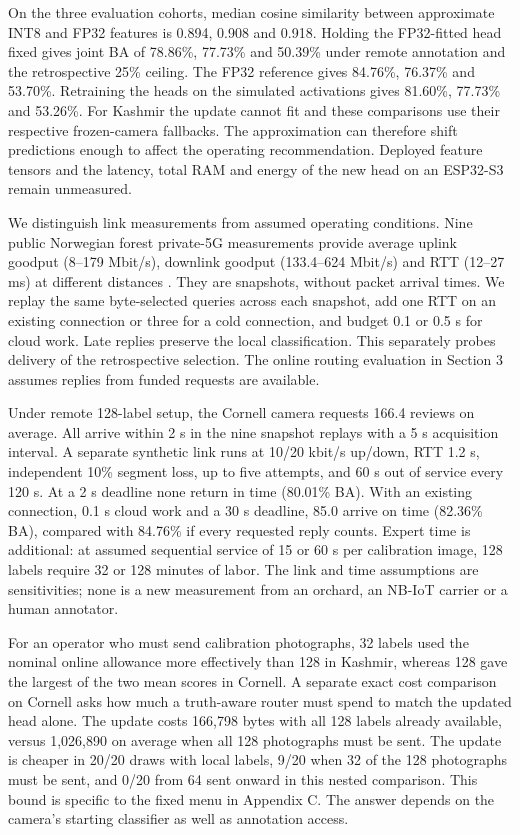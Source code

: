 On the three evaluation cohorts, median cosine similarity between approximate INT8 and FP32 features is 0.894, 0.908 and 0.918. Holding the FP32-fitted head fixed gives joint BA of 78.86\%, 77.73\% and 50.39\% under remote annotation and the retrospective 25\% ceiling. The FP32 reference gives 84.76\%, 76.37\% and 53.70\%. Retraining the heads on the simulated activations gives 81.60\%, 77.73\% and 53.26\%. For Kashmir the update cannot fit and these comparisons use their respective frozen-camera fallbacks. The approximation can therefore shift predictions enough to affect the operating recommendation. Deployed feature tensors and the latency, total RAM and energy of the new head on an ESP32-S3 remain unmeasured.

\newpage
{}
We distinguish link measurements from assumed operating conditions. Nine public Norwegian forest private-5G measurements provide average uplink goodput (8--179 Mbit/s), downlink goodput (133.4--624 Mbit/s) and RTT (12--27 ms) at different distances \cite{forest}. They are snapshots, without packet arrival times. We replay the same byte-selected queries across each snapshot, add one RTT on an existing connection or three for a cold connection, and budget 0.1 or 0.5 s for cloud work. Late replies preserve the local classification. This separately probes delivery of the retrospective selection. The online routing evaluation in Section 3 assumes replies from funded requests are available.

Under remote 128-label setup, the Cornell camera requests 166.4 reviews on average. All arrive within 2 s in the nine snapshot replays with a 5 s acquisition interval. A separate synthetic link runs at 10/20 kbit/s up/down, RTT 1.2 s, independent 10\% segment loss, up to five attempts, and 60 s out of service every 120 s. At a 2 s deadline none return in time (80.01\% BA). With an existing connection, 0.1 s cloud work and a 30 s deadline, 85.0 arrive on time (82.36\% BA), compared with 84.76\% if every requested reply counts. Expert time is additional: at assumed sequential service of 15 or 60 s per calibration image, 128 labels require 32 or 128 minutes of labor. The link and time assumptions are sensitivities; none is a new measurement from an orchard, an NB-IoT carrier or a human annotator.

For an operator who must send calibration photographs, 32 labels used the nominal online allowance more effectively than 128 in Kashmir, whereas 128 gave the largest of the two mean scores in Cornell. A separate exact cost comparison on Cornell asks how much a truth-aware router must spend to match the updated head alone. The update costs 166,798 bytes with all 128 labels already available, versus 1,026,890 on average when all 128 photographs must be sent. The update is cheaper in 20/20 draws with local labels, 9/20 when 32 of the 128 photographs must be sent, and 0/20 from 64 sent onward in this nested comparison. This bound is specific to the fixed menu in Appendix C. The answer depends on the camera's starting classifier as well as annotation access.

